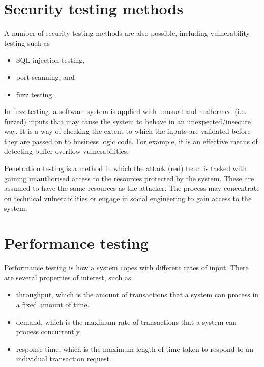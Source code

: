 \documentclass[a4paper, openany]{memoir}
\begin{document}
\section{Security testing methods}
A number of security testing methods are also possible, including vulnerability testing such as
\begin{itemize}
    \item SQL injection testing,
    \item port scanning, and
    \item fuzz testing.
\end{itemize}
In fuzz testing, a software system is applied with unusual and malformed (i.e. fuzzed) inputs that may cause the system to behave in an unexpected/insecure way. It is a way of checking the extent to which the inputs are validated before they are passed on to business logic code. For example, it is an effective means of detecting buffer overflow vulnerabilities.

Penetration testing is a method in which the attack (red) team is tasked with gaining unauthorised access to the resources protected by the system. These are assumed to have the same resources as the attacker. The process may concentrate on technical vulnerabilities or engage in social engineering to gain access to the system.

\section{Performance testing}
Performance testing is how a system copes with different rates of input. There are several properties of interest, such as:
\begin{itemize}
    \item throughput, which is the amount of transactions that a system can process in a fixed amount of time.
    \item demand, which is the maximum rate of transactions that a system can process concurrently.
    \item response time, which is the maximum length of time taken to respond to an individual transaction request.
\end{itemize}
\end{document}
